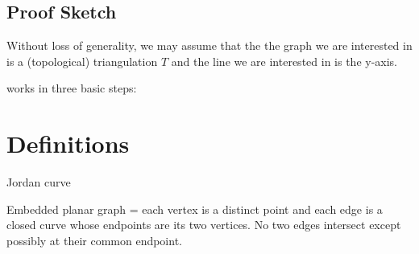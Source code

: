 \documentclass{patmorin}
\begin{document}
\subsection{Proof Sketch}


Without loss of generality, we may assume that the the graph we are
interested in is a (topological) triangulation $T$ and the line we are
interested in is the y-axis.

%
%
%


works in three basic steps: 


\section{Definitions}

Jordan curve

Embedded planar graph = each vertex is a distinct point and each edge is a closed curve whose endpoints are its two vertices.  No two edges intersect except possibly at their common endpoint.
\end{document}
